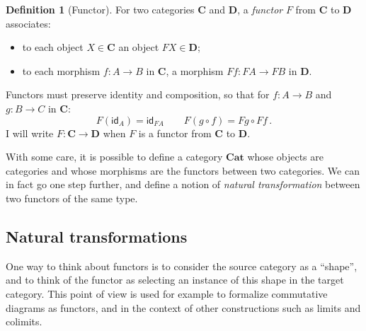 \documentclass[11pt,oneside,draft]{book}
\theoremstyle{definition}
\newtheorem{definition}[theorem]{Definition}
\newcommand{\kw}[1]{\ensuremath{ \mathsf{#1} }}
\begin{document}
\begin{definition}[Functor] \label{def:functor} %
For two categories $\mathbf{C}$ and $\mathbf{D}$,
a \emph{functor} $F$ from $\mathbf{C}$ to $\mathbf{D}$
associates:
\begin{itemize}
  \item
    to each object $X \in \mathbf{C}$ an object $F X \in \mathbf{D}$;
  \item
    to each morphism $f : A \rightarrow B$ in $\mathbf{C}$,
    a morphism $F f : F A \rightarrow F B$ in $\mathbf{D}$.
\end{itemize}
Functors must preserve identity and composition,
so that for
$f : A \rightarrow B$ and
$g : B \rightarrow C$ in $\mathbf{C}$:
\[
  F (\kw{id}_A) = \kw{id}_{F A}
  \qquad
  F (g \circ f) = F g \circ F f
  \,.
\]
I will write $F : \mathbf{C} \rightarrow \mathbf{D}$
when $F$ is a functor from $\mathbf{C}$ to $\mathbf{D}$.
\end{definition}

With some care,
it is possible to define a category $\mathbf{Cat}$
whose objects are categories and whose morphisms
are the functors between two categories.
We can in fact go one step further,
and define a notion of \emph{natural transformation}
between two functors of the same type.


\subsection{Natural transformations} %

One way to think about functors is
to consider the source category as a ``shape'',
and to think of the functor as
selecting an instance of this shape in the target category.
This point of view is used for example
to formalize commutative diagrams as functors,
and in the context of other constructions such as limits and colimits.
\end{document}
